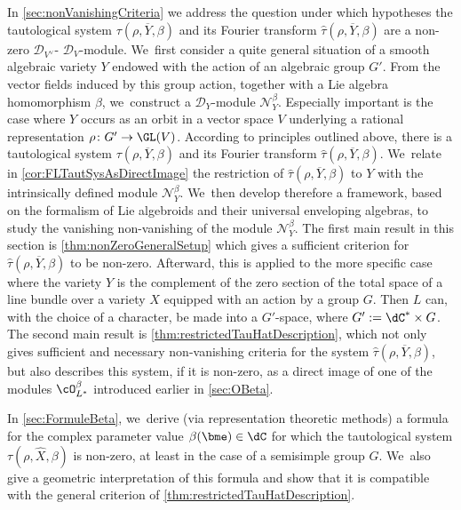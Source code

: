 In \cref{sec:nonVanishingCriteria} we address the question under which hypotheses the tautological system
$\tau(\rho,\overline{Y},\beta)$ and its Fourier transform $\hat{\tau}(\rho,\overline{Y},\beta)$ are a non-zero $\mathscr{D}_{V^\vee}$- \resp $\mathscr{D}_V$\nobreakdash-mod\-ule. We~first consider a quite general situation of a smooth algebraic variety $Y$ endowed with the action of an algebraic group $G'$. From the vector fields induced by this group action, together with a Lie algebra homomorphism $\beta$, we~construct a $\mathscr{D}_Y$\nobreakdash-mod\-ule $\mathscr{N}_Y^\beta$. Especially important is the case where $Y$ occurs as an orbit in a vector space $V$ underlying a rational representation $\rho\colon G'\to \GL(V)$. According to principles outlined above, there is a tautological system $\tau(\rho,\overline{Y},\beta)$ and its Fourier transform $\hat{\tau}(\rho,\overline{Y},\beta)$. We~relate in \cref{cor:FLTautSysAsDirectImage} the restriction of $\hat{\tau}(\rho,\overline{Y},\beta)$ to $Y$ with the intrinsically defined module $\mathscr{N}_Y^\beta$. We~then develop therefore a framework, based on the formalism of Lie algebroids and their universal enveloping algebras, to study the vanishing \resp non-vanishing of the module $\mathscr{N}_Y^\beta$. The first main result in this section is \cref{thm:nonZeroGeneralSetup} which gives a sufficient criterion for $\hat{\tau}(\rho, \overline{Y},\beta)$ to be non-zero. Afterward, this is applied to the more specific case where the variety $Y$ is the complement of the zero section of the total space of a line bundle over a variety $X$ equipped with an action by a group $G$. Then $L$ can, with the choice of a character, be made into a $G'$-space, where $G':=\dC^*\times G$. The second main result is \cref{thm:restrictedTauHatDescription}, which not only gives sufficient and necessary non-vanishing criteria for the
system $\hat{\tau}(\rho,\overline{Y},\beta)$, but also describes this system, if it is non-zero, as a direct image of one of the modules $\cO_{L^*}^\beta$ introduced earlier in \cref{sec:OBeta}.

In \cref{sec:FormuleBeta}, we~derive (via representation theoretic methods) a formula for the complex parameter value $\beta(\bme)\in \dC$
for which the tautological system $\tau(\rho, \hat{X}, \beta)$ is non-zero, at least in the case of a semisimple group $G$. We~also give a geometric interpretation of this formula and show that it is compatible with the general criterion of \cref{thm:restrictedTauHatDescription}.

